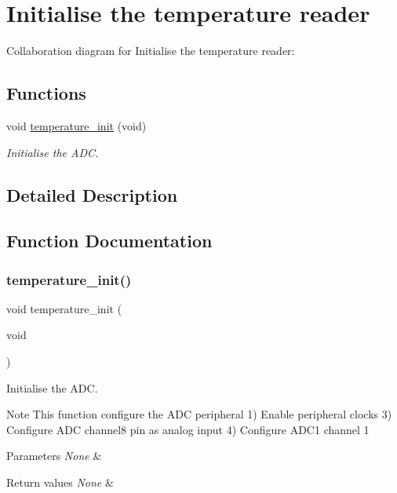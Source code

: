 \hypertarget{group___temperature___init}{}\section{Initialise the temperature reader}
\label{group___temperature___init}
Collaboration diagram for Initialise the temperature reader\+:
\subsection*{Functions}
\begin{DoxyCompactItemize}
\item 
void \hyperlink{group___temperature___init_ga7da890f6748bbeb05511fd20100cb6ef}{temperature\+\_\+init} (void)
\begin{DoxyCompactList}\small\item\em Initialise the A\+DC. \end{DoxyCompactList}\end{DoxyCompactItemize}


\subsection{Detailed Description}


\subsection{Function Documentation}
\mbox{\label{group___temperature___init_ga7da890f6748bbeb05511fd20100cb6ef}} 
\subsubsection{\texorpdfstring{temperature\+\_\+init()}{temperature\_init()}}
{\footnotesize\ttfamily void temperature\+\_\+init (\begin{DoxyParamCaption}\item[{void}]{ }\end{DoxyParamCaption})}



Initialise the A\+DC. 

\begin{DoxyNote}{Note}
This function configure the A\+DC peripheral 1) Enable peripheral clocks 3) Configure A\+DC channel8 pin as analog input 4) Configure A\+D\+C1 channel 1 
\end{DoxyNote}

\begin{DoxyParams}{Parameters}
{\em None} & \\
\hline
\end{DoxyParams}

\begin{DoxyRetVals}{Return values}
{\em None} & \\
\hline
\end{DoxyRetVals}

